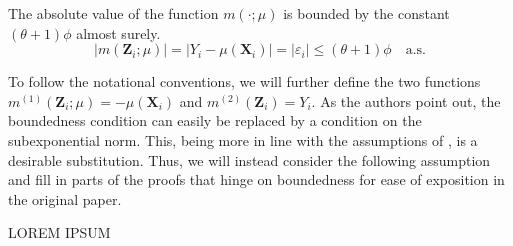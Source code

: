 \documentclass[letterpaper,10pt]{article}
\numberwithin{equation}{section}
\numberwithin{theorem}{section}
\numberwithin{remark}{section}
\numberwithin{example}{section}
\theoremstyle{definition}
\newcommand{\1}{\mathbb{1}}
\begin{document}
\vspace{0.5cm}
\begin{assumption}
	The absolute value of the function $m(\cdot; \mu)$ is bounded by the constant $(\theta+1) \phi$ almost surely.
	\begin{equation}
		|m(\mathbf{Z}_i ; \mu)|
		= |Y_i - \mu(\mathbf{X}_i)|
		= |\varepsilon_i|
		\leq (\theta+1) \phi
		\quad \text{a.s.}
	\end{equation}
\end{assumption}
To follow the notational conventions, we will further define the two functions $m^{(1)}(\mathbf{Z}_i; \mu) = - \mu(\mathbf{X}_i)$ and $m^{(2)}(\mathbf{Z}_i) = Y_i$.
As the authors point out, the boundedness condition can easily be replaced by a condition on the subexponential norm.
This, being more in line with the assumptions of \citet{demirkaya_optimal_2024}, is a desirable substitution.
Thus, we will instead consider the following assumption and fill in parts of the proofs that hinge on boundedness for ease of exposition in the original paper.

\vspace{0.5cm}
\begin{assumption}

\end{assumption}

{\color{red} LOREM IPSUM}



\end{document}
